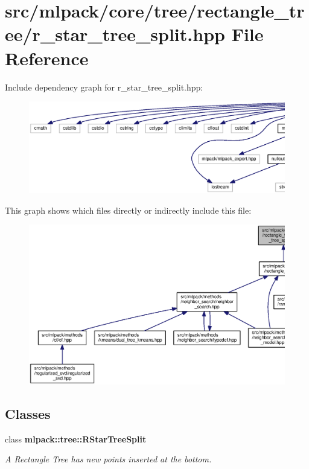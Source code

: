 \section{src/mlpack/core/tree/rectangle\+\_\+tree/r\+\_\+star\+\_\+tree\+\_\+split.hpp File Reference}
\label{r__star__tree__split_8hpp}
Include dependency graph for r\+\_\+star\+\_\+tree\+\_\+split.\+hpp\+:
\nopagebreak
\begin{figure}[H]
\begin{center}
\leavevmode
\includegraphics[width=350pt]{r__star__tree__split_8hpp__incl}
\end{center}
\end{figure}
This graph shows which files directly or indirectly include this file\+:
\nopagebreak
\begin{figure}[H]
\begin{center}
\leavevmode
\includegraphics[width=350pt]{r__star__tree__split_8hpp__dep__incl}
\end{center}
\end{figure}
\subsection*{Classes}
\begin{DoxyCompactItemize}
\item 
class {\bf mlpack\+::tree\+::\+R\+Star\+Tree\+Split}
\begin{DoxyCompactList}\small\item\em A Rectangle Tree has new points inserted at the bottom. \end{DoxyCompactList}\end{DoxyCompactItemize}
